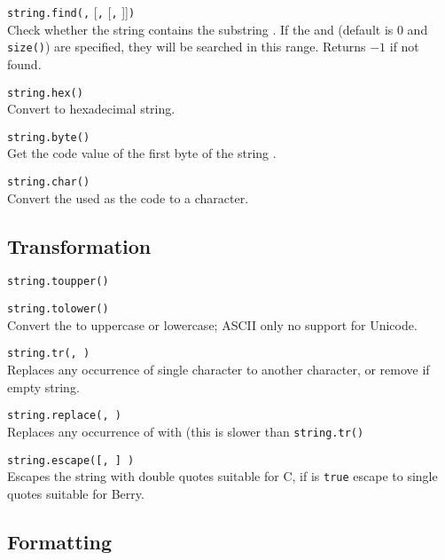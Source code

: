 \hangpar \texttt{string.find(}\texttt{,} [\texttt{,} [\texttt{,} ]]\texttt{)}\\
Check whether the string  contains the substring . If the  and  (default is $0$ and \texttt{size(}\texttt{)}) are specified, they will be searched in this range. Returns $-1$ if not found.

\hangpar \texttt{string.hex(}\texttt{)}\\
Convert  to hexadecimal string.

\hangpar \texttt{string.byte(}\texttt{)}\\
Get the code value of the first byte of the string .

\hangpar \texttt{string.char(}\texttt{)}\\
Convert the  used as the code to a character.

\subsection*{Transformation}

\hangpar \texttt{string.toupper(}\texttt{)}

\hangpar \texttt{string.tolower(}\texttt{)}\\
Convert the  to uppercase or lowercase; ASCII only no support for Unicode.

\hangpar \texttt{string.tr(}\texttt{, }\texttt{)}\\
Replaces any occurrence of single character  to another character, or remove if empty string.

\hangpar \texttt{string.replace(}\texttt{, }\texttt{)}\\
Replaces any occurrence of  with  (this is slower than \texttt{string.tr()}

\hangpar \texttt{string.escape(}\texttt{[, }\texttt{] )}\\
Escapes the string with double quotes suitable for C, if  is \texttt{true} escape to single quotes suitable for Berry.

\subsection*{Formatting}

